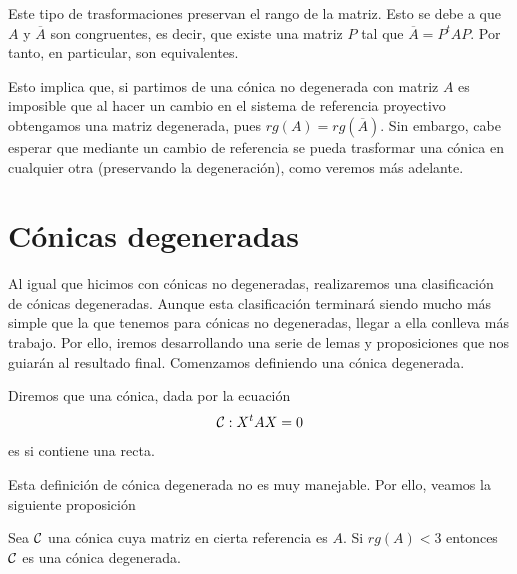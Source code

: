 Este tipo de trasformaciones preservan el rango de la matriz. Esto se debe a que $A$ y $\overline{A}$ son congruentes, es decir, que existe una matriz $P$ tal que $\overline{A}=P^tAP$. Por tanto, en particular, son equivalentes.

Esto implica que, si partimos de una cónica no degenerada con matriz $A$ es imposible que al hacer un cambio en el sistema de referencia proyectivo obtengamos una matriz degenerada, pues $rg(A)=rg(\overline{A})$. Sin embargo, cabe esperar que mediante un cambio de referencia se pueda trasformar una cónica en cualquier otra (preservando la degeneración), como veremos más adelante.

\section{Cónicas degeneradas}
\label{C8_sec_conicas_degeneradas}
Al igual que hicimos con cónicas no degeneradas, realizaremos una clasificación de cónicas degeneradas. Aunque esta clasificación terminará siendo mucho más simple que la que tenemos para cónicas no degeneradas, llegar a ella conlleva más trabajo. Por ello, iremos desarrollando una serie de lemas y proposiciones que nos guiarán al resultado final. Comenzamos definiendo una cónica degenerada.
\begin{defi}
	Diremos que una cónica, dada por la ecuación
	\begin{equation}
	\mathcal{C}:X^tAX=0
	\end{equation}
	es  si contiene una recta.
\end{defi}

Esta definición de cónica degenerada no es muy manejable. Por ello, veamos la siguiente proposición
\begin{prop}\label{C8_prop_rango_menor_3_degenerada}
	Sea $\mathcal{C}$ una cónica cuya matriz en cierta referencia es $A$. Si $rg(A)<3$ entonces $\mathcal{C}$ es una cónica degenerada.
\end{prop}

